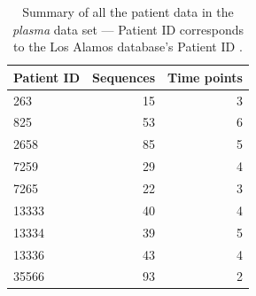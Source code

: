 \documentclass[12pt]{article}
\begin{document}
\begin{table}[!ht]
\def\arraystretch{1.3}%
\begin{center}
\begin{tabular}{lrr} 
Patient ID & Sequences & Time points \\
\hline
263 & 15 & 3 \\
825 & 53 & 6 \\
2658 & 85 & 5 \\
7259 & 29 & 4 \\
7265 & 22 & 3 \\
13333 & 40 & 4 \\
13334 & 39 & 5 \\
13336 & 43 & 4 \\
35566 & 93 & 2 \\
\hline
\end{tabular}
\end{center}
  \caption{Summary of all the patient data in the \emph{plasma} data set --- Patient ID corresponds to the Los Alamos database's Patient ID \citep{LosAlamos}.
   }\label{tab:patientsplasma} 
\end{table}
\end{document}
